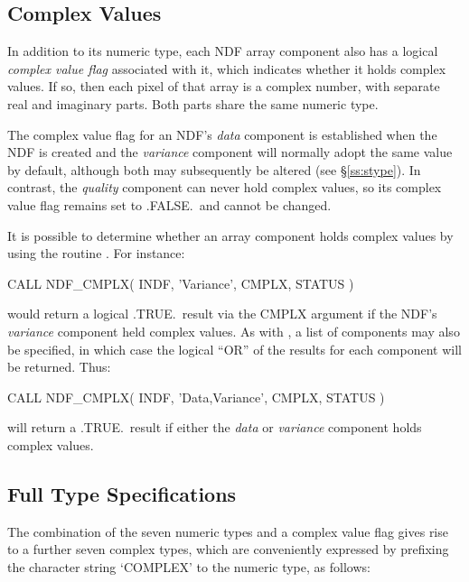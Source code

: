 \documentclass[twoside,11pt,nolof]{starlink}
\providecommand{\st}[1]{{\emph{#1}}}
\begin{document}
\subsection{Complex Values}

In addition to its numeric type, each NDF array component also has a logical
\st{complex value flag\/} associated with it, which indicates whether it
holds complex values.
If so, then each pixel of that array is a complex number, with separate real
and imaginary parts.
Both parts share the same numeric type.

The complex value flag for an NDF's \st{data\/} component is established when the
NDF is created and the \st{variance\/} component will normally adopt the same
value by default, although both may subsequently be altered (see
\S\ref{ss:stype}).
In contrast, the \st{quality\/} component can never hold complex values, so its
complex value flag remains set to .FALSE.\ and cannot be changed.

It is possible to determine whether an array component holds complex values
by using the routine .
For instance:

\small
\begin{terminalv}
      CALL NDF_CMPLX( INDF, 'Variance', CMPLX, STATUS )
\end{terminalv}
\normalsize

would return a logical .TRUE.\ result via the CMPLX argument if the NDF's
\st{variance\/} component held complex values.
As with , a list of components may also be specified, in which case
the logical ``OR'' of the results for each component will be returned.
Thus:

\small
\begin{terminalv}
      CALL NDF_CMPLX( INDF, 'Data,Variance', CMPLX, STATUS )
\end{terminalv}
\normalsize

will return a .TRUE.\ result if either the \st{data\/} or \st{variance\/} component
holds complex values.

\subsection{Full Type Specifications}

The combination of the seven numeric types and a complex value flag gives rise
to a further seven complex types, which are conveniently  expressed by prefixing
the character string `COMPLEX' to the numeric type, as follows:
\end{document}
